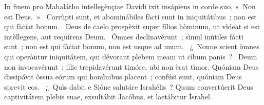 { In finem pro Mahalátho intellegènçiae Davídi}
{%
ixit insápiens in corde suo, «~Non est Deus.~»
~Corrùpti sunt, et abominábiles fàcti sunt in iniquitátibus~; non est qui fàċiat bonum. 
~Deus de ċaelo prospèxit super fílios hòminum, ut vìdeat si est intèllegens, aut requírens Deum. 
~Òmnes declinavérunt~; sìmul inútiles fàcti sunt~; non est qui fàċiat bonum, non est usque ad unum. 
~¿~Nonne scient òmnes qui operàntur iniquitátem, qui dévorant plebem meam ut ċìbum panis~? 
~Deum non invocavérunt~; illic trepidavérunt timóre, ubi non èrat tìmor. Quóniam Deus dissipávit òssua eórum qui homìnibus plaċent~; confúsi sunt, quóniam Deus sprevit eos. 
~¿~Quìs dabit e Sióne salutáre Israhélis~? Quum convertúerit Deus captivitátem plebis suae, exsultábit Jacóbus, et laetábitur Ìsrahel. 
}
